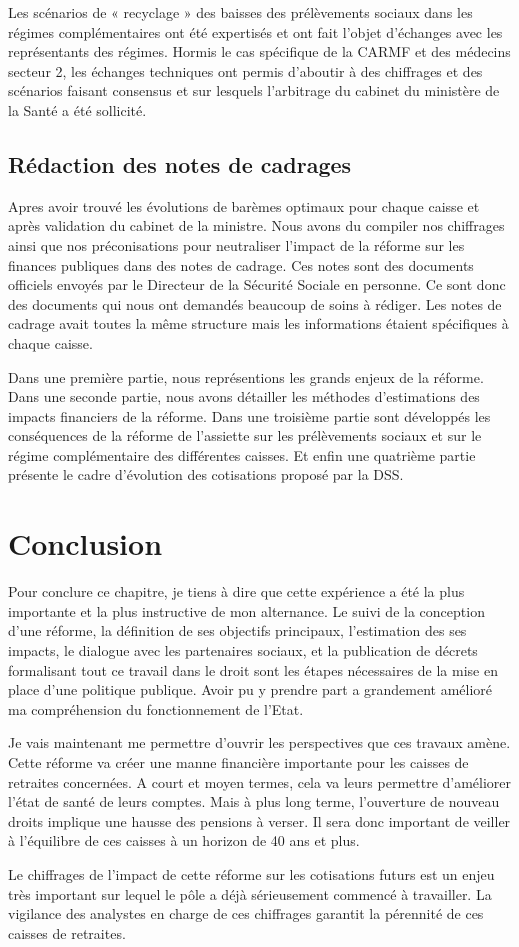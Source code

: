 Les scénarios de « recyclage » des baisses des prélèvements sociaux dans les régimes complémentaires ont été expertisés et ont fait l’objet d’échanges avec les représentants des régimes. Hormis le cas spécifique de la CARMF et des médecins secteur 2, les échanges techniques ont permis d’aboutir à des chiffrages et des scénarios faisant consensus et sur lesquels l'arbitrage du cabinet du ministère de la Santé a été sollicité.


\subsection{Rédaction des notes de cadrages}

Apres avoir trouvé les évolutions de barèmes optimaux pour chaque caisse et après validation du cabinet de la ministre. Nous avons du compiler nos chiffrages ainsi que nos préconisations pour neutraliser l'impact de la réforme sur les finances publiques dans des notes de cadrage. Ces notes sont des documents officiels envoyés par le Directeur de la Sécurité Sociale en personne. Ce sont donc des documents qui nous ont demandés beaucoup de soins à rédiger.
Les notes de cadrage avait toutes la même structure mais les informations étaient spécifiques à chaque caisse.

Dans une première partie, nous représentions les grands enjeux de la réforme. Dans une seconde partie, nous avons détailler les méthodes d'estimations des impacts financiers de la réforme.
Dans une troisième partie sont développés les conséquences de la réforme de l’assiette sur les prélèvements sociaux et sur le régime complémentaire des différentes caisses. Et enfin une quatrième partie présente le cadre d’évolution des cotisations proposé par la DSS.


\section{Conclusion}

Pour conclure ce chapitre, je tiens à dire que cette expérience a été la plus importante et la plus instructive de mon alternance. Le suivi de la conception d'une réforme, la définition de ses objectifs principaux, l'estimation des ses impacts, le dialogue avec les partenaires sociaux, et la publication de décrets formalisant tout ce travail dans le droit sont les étapes nécessaires de la mise en place d'une politique publique. Avoir pu y prendre part a grandement amélioré ma compréhension du fonctionnement de l'Etat.

Je vais maintenant me permettre d'ouvrir les perspectives que ces travaux amène. Cette réforme va créer une manne financière importante pour les caisses de retraites concernées. A court et moyen termes, cela va leurs permettre d'améliorer l'état de santé de leurs comptes. Mais à plus long terme, l'ouverture de nouveau droits implique une hausse des pensions à verser. Il sera donc important de veiller à l'équilibre de ces caisses à un horizon de 40 ans et plus.

Le chiffrages de l'impact de cette réforme sur les cotisations futurs est un enjeu très important sur lequel le pôle a déjà sérieusement commencé à travailler. La vigilance des analystes en charge de ces chiffrages garantit la pérennité de ces caisses de retraites.
